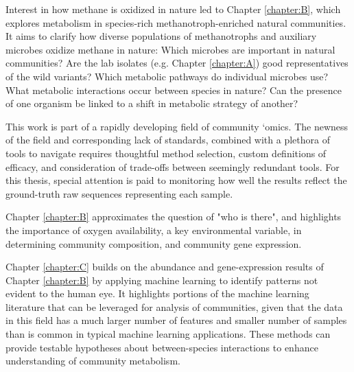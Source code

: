 Interest in how methane is oxidized in nature led to Chapter \ref{chapter:B}, which explores metabolism in species-rich methanotroph-enriched natural communities.
It aims to clarify how diverse populations of methanotrophs and auxiliary microbes oxidize methane in nature: %
Which microbes are important in natural communities?
Are the lab isolates (e.g. Chapter \ref{chapter:A}) good representatives of the wild variants?
Which metabolic pathways do individual microbes use?
What metabolic interactions occur between species in nature?
Can the presence of one organism be linked to a shift in metabolic strategy of another?

This work is part of a rapidly developing field of community `omics.
The newness of the field and corresponding lack of standards, combined with a plethora of tools to navigate requires thoughtful method selection, custom definitions of efficacy, and consideration of trade-offs between seemingly redundant tools.
For this thesis, special attention is paid to monitoring how well the results reflect the ground-truth raw sequences representing each sample.


Chapter \ref{chapter:B} approximates %
the question of "who is there", and highlights the importance of oxygen availability, a key environmental variable, in determining community composition, and community gene expression.

Chapter \ref{chapter:C} builds on the abundance and gene-expression results of Chapter \ref{chapter:B} by applying machine learning to identify patterns not evident to the human eye.
It highlights portions of the machine learning literature that can be leveraged for analysis of communities, given that the data in this field has a much larger number of features and smaller number of samples than is common in typical machine learning applications.
These methods can provide testable hypotheses about between-species interactions to enhance understanding of community metabolism.





